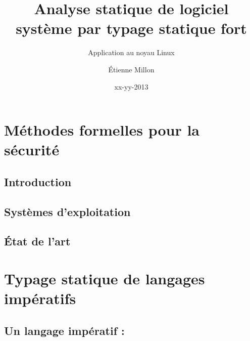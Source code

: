 \documentclass[a4paper,11pt]{memoir}
\title{Analyse statique de logiciel système par typage statique fort}
\subtitle{Application au noyau Linux}
\author{Étienne Millon}
\date{xx-yy-2013}
\begin{document}
\frontmatter

\begin{titlingpage}
\titleUL{}
\end{titlingpage}

\cleartorecto

\asuabstract



\asuacknowledgements




\tableofcontents

\mainmatter

\part{Méthodes formelles pour la sécurité}
\label{part:ctx}



\chapter{Introduction}

\label{cha:intro}


\chapter{Systèmes d'exploitation}

\label{cha:os}



%

\chapter{État de l'art}

\label{cha:etatdelart}


\part{Typage statique de langages impératifs}
\label{part:lang}



\chapter{Un langage impératif : \langname}
\end{document}

